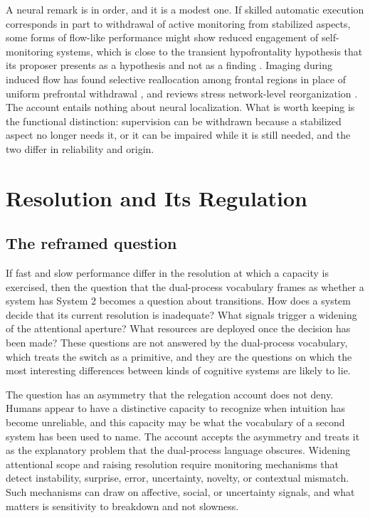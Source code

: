 \documentclass[11pt]{report}
\theoremstyle{remark}
\theoremstyle{definition}
\begin{document}
A neural remark is in order, and it is a modest one. If skilled automatic execution corresponds in part to withdrawal of active monitoring from stabilized aspects, some forms of flow-like performance might show reduced engagement of self-monitoring systems, which is close to the transient hypofrontality hypothesis that its proposer presents as a hypothesis and not as a finding \cite{dietrich2003}. Imaging during induced flow has found selective reallocation among frontal regions in place of uniform prefrontal withdrawal \cite{ulrich2014}, and reviews stress network-level reorganization \cite{vanderlinden2021}. The account entails nothing about neural localization. What is worth keeping is the functional distinction: supervision can be withdrawn because a stabilized aspect no longer needs it, or it can be impaired while it is still needed, and the two differ in reliability and origin.

\chapter{Resolution and Its Regulation}\label{ch:resolution}

\section{The reframed question}

If fast and slow performance differ in the resolution at which a capacity is exercised, then the question that the dual-process vocabulary frames as whether a system has System 2 becomes a question about transitions. How does a system decide that its current resolution is inadequate? What signals trigger a widening of the attentional aperture? What resources are deployed once the decision has been made? These questions are not answered by the dual-process vocabulary, which treats the switch as a primitive, and they are the questions on which the most interesting differences between kinds of cognitive systems are likely to lie.

The question has an asymmetry that the relegation account does not deny. Humans appear to have a distinctive capacity to recognize when intuition has become unreliable, and this capacity may be what the vocabulary of a second system has been used to name. The account accepts the asymmetry and treats it as the explanatory problem that the dual-process language obscures. Widening attentional scope and raising resolution require monitoring mechanisms that detect instability, surprise, error, uncertainty, novelty, or contextual mismatch. Such mechanisms can draw on affective, social, or uncertainty signals, and what matters is sensitivity to breakdown and not slowness.
\end{document}

